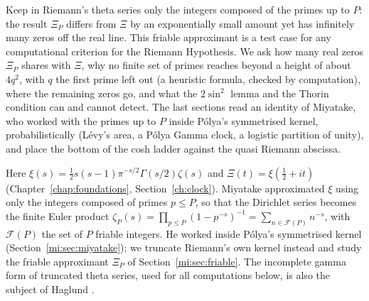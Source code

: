 \label{chap:miyatake}\label{ch:miyatake}

\ifdefined\conjecture\else\theoremstyle{sc}\newtheorem{conjecture}[theorem]{Conjecture}\theoremstyle{scr}\fi

Keep in Riemann's theta series only the integers composed of the primes up to $P$: the result $\Xi_P$ differs from $\Xi$ by an exponentially small amount yet has infinitely many zeros off the real line. This friable approximant is a test case for any computational criterion for the Riemann Hypothesis. We ask how many real zeros $\Xi_P$ shares with $\Xi$, why no finite set of primes reaches beyond a height of about $4q^2$, with $q$ the first prime left out (a heuristic formula, checked by computation), where the remaining zeros go, and what the $2\sin^2$ lemma and the Thorin condition can and cannot detect. The last sections read an identity of Miyatake, who worked with the primes up to $P$ inside P\'olya's symmetrised kernel, probabilistically (L\'evy's area, a P\'olya Gamma clock, a logistic partition of unity), and place the bottom of the cosh ladder against the quasi Riemann abscissa.

Here $\xi(s)=\tfrac12s(s-1)\pi^{-s/2}\Gamma(s/2)\zeta(s)$ and $\Xi(t)=\xi(\tfrac12+it)$ (Chapter~\ref{chap:foundations}, Section~\ref{ch:clock}). Miyatake \cite{Miyatake51b,Miyatake51a} approximated $\xi$ using only the integers composed of primes $p\le P$, so that the Dirichlet series becomes the finite Euler product $\zeta_P(s)=\prod_{p\le P}(1-p^{-s})^{-1}=\sum_{n\in\mathcal F(P)}n^{-s}$, with $\mathcal F(P)$ the set of $P$ friable integers. %
He worked inside P\'olya's symmetrised kernel (Section~\ref{mi:sec:miyatake}); we truncate Riemann's own kernel instead and study the friable approximant $\Xi_P$ of Section~\ref{mi:sec:friable}. The incomplete gamma form of truncated theta series, used for all computations below, is also the subject of Haglund \cite{Haglund09}. %

